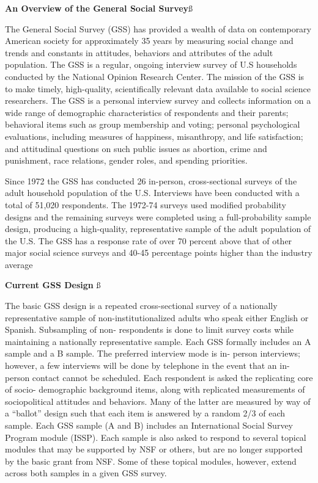 \ms


\textbf{An Overview of the General Social Survey}\ss

The General Social Survey (GSS) has provided a wealth of data on contemporary American society for approximately 35 years by measuring social change and trends and constants in attitudes, behaviors and attributes of the adult population. The GSS is a regular, ongoing interview survey of U.S households conducted by the National Opinion Research Center. The mission of the GSS is to make timely, high-quality, scientifically relevant data available to social science researchers. The GSS is a personal interview survey and collects information on a wide range of demographic characteristics of respondents and their parents; behavioral items such as group membership and voting; personal psychological evaluations, including measures of happiness, misanthropy, and life satisfaction; and attitudinal questions on such public issues as abortion, crime and punishment, race relations, gender roles, and spending priorities.

Since 1972 the GSS has conducted 26 in-person, cross-sectional surveys of the adult household population of the U.S. Interviews have been conducted with a total of 51,020 respondents. The 1972-74 surveys used modified probability designs and the remaining surveys were completed using a full-probability sample design, producing a high-quality, representative sample of the adult population of the U.S. The GSS has a response rate of over 70 percent above that of other major social science surveys and 40-45 percentage points higher than the industry average


\ms

 \textbf{Current GSS Design} \ss

The basic GSS design is a repeated cross-sectional survey of a nationally representative sample of non-institutionalized adults who speak either English or Spanish. Subsampling of non- respondents is done to limit survey costs while maintaining a nationally representative sample. Each GSS formally includes an A sample and a B sample. The preferred interview mode is in- person interviews; however, a few interviews will be done by telephone in the event that an in- person contact cannot be scheduled. Each respondent is asked the replicating core of socio- demographic background items, along with replicated measurements of sociopolitical attitudes and behaviors. Many of the latter are measured by way of a “ballot” design such that each item is answered by a random 2/3 of each sample. Each GSS sample (A and B) includes an International Social Survey Program module (ISSP). Each sample is also asked to respond to several topical modules that may be supported by NSF or others, but are no longer supported by the basic grant from NSF. Some of these topical modules, however, extend across both samples in a given GSS survey.

